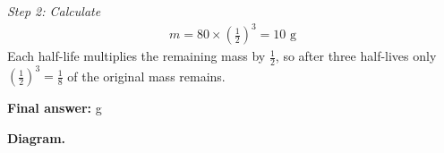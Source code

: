 \documentclass[11pt]{article}
\begin{document}
\textit{Step 2: Calculate}
\[\begin{gathered}
m = 80 \times \left(\frac{1}{2}\right)^3 = 10 \text{ g}
\end{gathered}\]
Each half-life multiplies the remaining mass by \( \tfrac{1}{2} \), so after three half-lives only \( \left(\tfrac{1}{2}\right)^3 = \tfrac{1}{8} \) of the original mass remains.

\begin{answerbox}
\textbf{Final answer:} g
\end{answerbox}
\textbf{Diagram.}

\begin{center}
\end{center}
\end{document}
